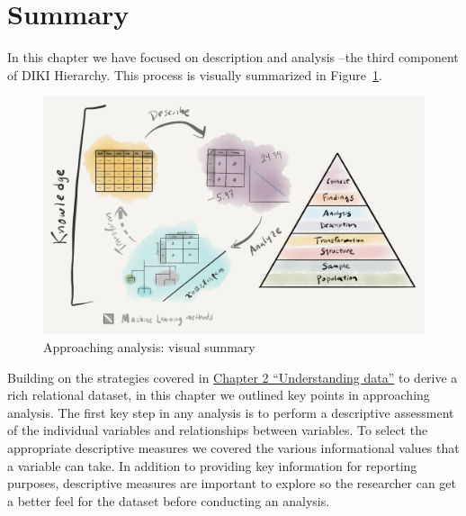 \documentclass[
  letterpaper,
]{scrbook}
\begin{document}
\hypertarget{summary-3}{%
\section*{Summary}\label{summary-3}}


In this chapter we have focused on description and analysis --the third
component of DIKI Hierarchy. This process is visually summarized in
Figure~\ref{fig-approaching-analysis-visual-summary-graphic}.

\begin{figure}[h]

{\centering \includegraphics[width=7.17in,height=\textheight]{./figures/approaching-analysis/approaching-analysis-visual-summary-paper.png}

}

\caption{\label{fig-approaching-analysis-visual-summary-graphic}Approaching
analysis: visual summary}

\end{figure}

Building on the strategies covered in
\protect\hyperlink{sec-understanding-data}{Chapter 2 ``Understanding
data''} to derive a rich relational dataset, in this chapter we outlined
key points in approaching analysis. The first key step in any analysis
is to perform a descriptive assessment of the individual variables and
relationships between variables. To select the appropriate descriptive
measures we covered the various informational values that a variable can
take. In addition to providing key information for reporting purposes,
descriptive measures are important to explore so the researcher can get
a better feel for the dataset before conducting an analysis.
\end{document}
